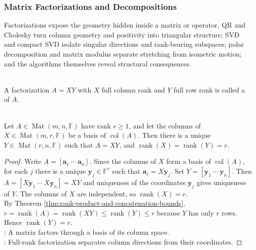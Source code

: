 \subsubsection{Matrix Factorizations and Decompositions}

Factorizations expose the geometry hidden inside a matrix or operator. QR and Cholesky turn column geometry and positivity into triangular structure; SVD and compact SVD isolate singular directions and rank-bearing subspaces; polar decomposition and matrix modulus separate stretching from isometric motion; and the algorithms themselves reveal structural consequences.

\begin{definition} \label{def:full-rank-factorization} \\
A factorization $A=XY$ with $X$ full column rank and $Y$ full row rank is called a  of $A$.
\end{definition}

\begin{theorem} \label{thm:full-rank-factorization} \\
Let $A\in\operatorname{Mat}(m,n,\mathbb{F})$ have rank $r\geq 1$, and let the columns of $X\in\operatorname{Mat}(m,r,\mathbb{F})$ be a basis of $\operatorname{col}(A)$. Then there is a unique $Y\in\operatorname{Mat}(r,n,\mathbb{F})$ such that $A=XY$, and $\operatorname{rank}(X)=\operatorname{rank}(Y)=r$.
\begin{proof}
Write $A=[\mathbf{a}_1\ \cdots\ \mathbf{a}_n]$. Since the columns of $X$ form a basis of $\operatorname{col}(A)$, for each $j$ there is a unique $\mathbf{y}_j\in\mathbb{F}^r$ such that $\mathbf{a}_j=X\mathbf{y}_j$. Set $Y=[\mathbf{y}_1\ \cdots\ \mathbf{y}_n]$. Then $A=[X\mathbf{y}_1\ \cdots\ X\mathbf{y}_n]=XY$ and uniqueness of the coordinates $\mathbf{y}_j$ gives uniqueness of $Y$. The columns of $X$ are independent, so $\operatorname{rank}(X)=r$.\\
By Theorem \ref{thm:rank-product-and-concatenation-bounds}, $r=\operatorname{rank}(A)=\operatorname{rank}(XY)\leq \operatorname{rank}(Y)\leq r$ because $Y$ has only $r$ rows. Hence $\operatorname{rank}(Y)=r$.\\
: A matrix factors through a basis of its column space.\\
: Full-rank factorization separates column directions from their coordinates.
\end{proof}
\end{theorem}

